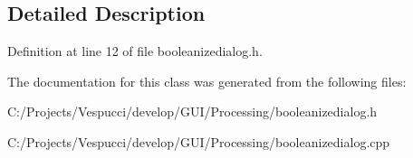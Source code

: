 \subsection{Detailed Description}


Definition at line 12 of file booleanizedialog.\+h.



The documentation for this class was generated from the following files\+:\begin{DoxyCompactItemize}
\item 
C\+:/\+Projects/\+Vespucci/develop/\+G\+U\+I/\+Processing/booleanizedialog.\+h\item 
C\+:/\+Projects/\+Vespucci/develop/\+G\+U\+I/\+Processing/booleanizedialog.\+cpp\end{DoxyCompactItemize}
